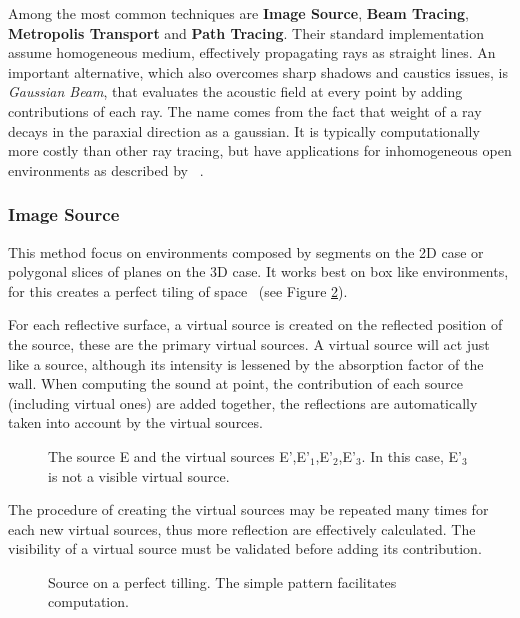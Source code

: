 Among the most common techniques are \textbf{Image Source}, \textbf{Beam
Tracing}, \textbf{Metropolis Transport} and \textbf{Path Tracing}. Their
standard implementation assume homogeneous medium, effectively propagating rays
as straight lines. An important alternative, which also overcomes sharp shadows
and caustics issues, is \textit{Gaussian Beam}, that evaluates the acoustic
field at every point by adding contributions of each ray. The name comes from the fact
that weight of a ray decays in the paraxial direction as a gaussian. It is
typically computationally more costly than other ray tracing, but have
applications for inhomogeneous open environments as described by
~\citet{traceroutdoor}.

\subsubsection{Image Source}

This method focus on environments composed by segments on the 2D case or
polygonal slices of planes on the 3D case. It works best on box like
environments, for this creates a perfect tiling of
space~\cite{funkhouser2003survey} (see Figure \ref{fig:tillingsource}).

For each reflective surface, a virtual source is created on the reflected
position of the source, these are the primary virtual sources. A virtual source
will act just like a source, although its intensity is lessened by the absorption
factor of the wall. When computing the sound at point, the
contribution of each source (including virtual ones) are added together, the
reflections are automatically taken into account by the virtual sources.

\begin{figure}[h]
	\centering
	
	\caption{The source E and the virtual sources E',E'$_1$,E'$_2$,E'$_3$. In this
	case, E'$_3$ is not a visible virtual source.}
	\label{fig:imagesource}
\end{figure}


The procedure of creating the virtual sources may be repeated many times for
each new virtual sources, thus more reflection are effectively calculated. The
visibility of a virtual source must be validated before adding its contribution.

\begin{figure}[h]
	\centering
	
	\caption{Source on a perfect tilling. The simple pattern facilitates
	computation.}
	\label{fig:tillingsource}
\end{figure}

